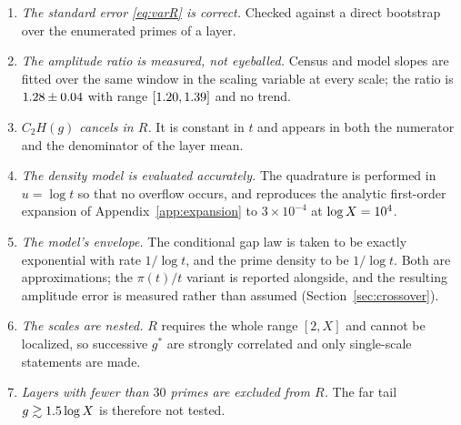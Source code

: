 \begin{enumerate}
\item[V] \emph{The standard error \eqref{eq:varR} is correct.} Checked against a direct bootstrap over the enumerated primes of a layer.

\item[V] \emph{The amplitude ratio is measured, not eyeballed.} Census and model slopes are fitted over the same window in the scaling variable at every scale; the ratio is $1.28\pm0.04$ with range $[1.20,1.39]$ and no trend.
\item[V] \emph{$C_2H(g)$ cancels in $R$.} It is constant in $t$ and appears in both the numerator and the denominator of the layer mean.
\item[V] \emph{The density model is evaluated accurately.} The quadrature is performed in $u=\log t$ so that no overflow occurs, and reproduces the analytic first-order expansion of Appendix~\ref{app:expansion} to $3\times10^{-4}$ at $\log X=10^{4}$.
\item[S] \emph{The model's envelope.} The conditional gap law is taken to be exactly exponential with rate $1/\log t$, and the prime density to be $1/\log t$. Both are approximations; the $\pi(t)/t$ variant is reported alongside, and the resulting amplitude error is measured rather than assumed (Section~\ref{sec:crossover}).
\item[L] \emph{The scales are nested.} $R$ requires the whole range $[2,X]$ and cannot be localized, so successive $g^*$ are strongly correlated and only single-scale statements are made.
\item[L] \emph{Layers with fewer than $30$ primes are excluded from $R$.} The far tail $g\gtrsim1.5\log X$ is therefore not tested.
\end{enumerate}

